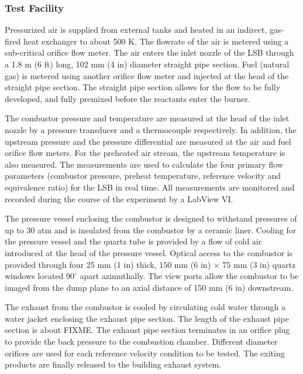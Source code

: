 \subsubsection{Test Facility}

Pressurized air is supplied from external tanks and heated in an indirect, gas-fired heat exchanger to about 500 K.
The flowrate of the air is metered using a sub-critical orifice flow meter.
The air enters the inlet nozzle of the LSB through a 1.8 m (6 ft) long, 102 mm (4 in) diameter straight pipe section.
Fuel (natural gas) is metered using another orifice flow meter and injected at the head of the straight pipe section.
The straight pipe section allows for the flow to be fully developed, and fully premixed before the reactants enter the burner.

The combustor pressure and temperature are measured at the head of the inlet nozzle by a pressure transducer and a thermocouple respectively.
In addition, the upstream pressure and the pressure differential are measured at the air and fuel orifice flow meters.
For the preheated air stream, the upstream temperature is also measured.
The measurements are used to calculate the four primary flow parameters (combustor pressure, preheat temperature, reference velocity and equivalence ratio) for the LSB in real time.
All measurements are monitored and recorded during the course of the experiment by a LabView VI.

The pressure vessel enclosing the combustor is designed to withstand pressures of up to 30 atm and is insulated from the combustor by a ceramic liner.
Cooling for the pressure vessel and the quartz tube is provided by a flow of cold air introduced at the head of the pressure vessel.
Optical access to the combustor is provided through four 25 mm (1 in) thick, 150 mm (6 in) \(\times\) 75 mm (3 in) quartz windows located \(90^\circ\) apart azimuthally.
The view ports allow the combustor to be imaged from the dump plane to an axial distance of 150 mm (6 in) downstream.

The exhaust from the combustor is cooled by circulating cold water through a water jacket enclosing the exhaust pipe section.
The length of the exhaust pipe section is about FIXME.
The exhaust pipe section terminates in an orifice plug to provide the back pressure to the combustion chamber.
Different diameter orifices are used for each reference velocity condition to be tested.
The exiting products are finally released to the building exhaust system.

